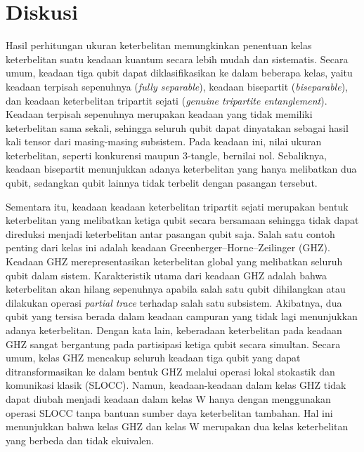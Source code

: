 \section{Diskusi}
Hasil perhitungan ukuran keterbelitan memungkinkan penentuan kelas keterbelitan suatu keadaan kuantum secara lebih mudah dan sistematis. Secara umum, keadaan tiga qubit dapat diklasifikasikan ke dalam beberapa kelas, yaitu keadaan terpisah sepenuhnya (\textit{fully separable}), keadaan bisepartit (\textit{biseparable}), dan keadaan keterbelitan tripartit sejati (\textit{genuine tripartite entanglement}). Keadaan terpisah sepenuhnya merupakan keadaan yang tidak memiliki keterbelitan sama sekali, sehingga seluruh qubit dapat dinyatakan sebagai hasil kali tensor dari masing-masing subsistem. Pada keadaan ini, nilai ukuran keterbelitan, seperti konkurensi maupun 3-tangle, bernilai nol. Sebaliknya, keadaan bisepartit menunjukkan adanya keterbelitan yang hanya melibatkan dua qubit, sedangkan qubit lainnya tidak terbelit dengan pasangan tersebut.

Sementara itu, keadaan keadaan keterbelitan tripartit sejati merupakan bentuk keterbelitan yang melibatkan ketiga qubit secara bersamaan sehingga tidak dapat direduksi menjadi keterbelitan antar pasangan qubit saja. Salah satu contoh penting dari kelas ini adalah keadaan Greenberger--Horne--Zeilinger (GHZ). Keadaan GHZ merepresentasikan keterbelitan global yang melibatkan seluruh qubit dalam sistem. Karakteristik utama dari keadaan GHZ adalah bahwa keterbelitan akan hilang sepenuhnya apabila salah satu qubit dihilangkan atau dilakukan operasi \textit{partial trace} terhadap salah satu subsistem. Akibatnya, dua qubit yang tersisa berada dalam keadaan campuran yang tidak lagi menunjukkan adanya keterbelitan. Dengan kata lain, keberadaan keterbelitan pada keadaan GHZ sangat bergantung pada partisipasi ketiga qubit secara simultan. Secara umum, kelas GHZ mencakup seluruh keadaan tiga qubit yang dapat ditransformasikan ke dalam bentuk GHZ melalui operasi lokal stokastik dan komunikasi klasik (SLOCC). Namun, keadaan-keadaan dalam kelas GHZ tidak dapat diubah menjadi keadaan dalam kelas W hanya dengan menggunakan operasi SLOCC tanpa bantuan sumber daya keterbelitan tambahan. Hal ini menunjukkan bahwa kelas GHZ dan kelas W merupakan dua kelas keterbelitan yang berbeda dan tidak ekuivalen.


